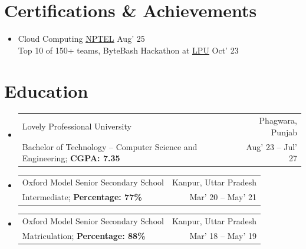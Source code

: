 \documentclass[a4paper,10pt]{article}
\makeatletter
\newcommand{\resumeSubheading}[4]{
  \vspace{-1pt}\item
  \begin{tabular*}{\textwidth}[t]{l@{\extracolsep{\fill}}r}
    \fontsize{10}{12}\selectfont\textcolor{LPUBlue}{#1} & \normalsize #2 \\
    \normalsize#3 & \normalsize #4 \\
  \end{tabular*}\vspace{-6pt}
}
\newcommand{\resumeSubHeadingListStart}{\begin{itemize}[leftmargin=0in, label={}]}
\newcommand{\resumeSubHeadingListEnd}{\end{itemize}}
\makeatother
\begin{document}
\section{Certifications \& Achievements}
\resumeSubHeadingListStart
  \item
  \fontsize{10}{12}\selectfont Cloud Computing \normalsize\textbar{} \href{https://drive.google.com/file/d/18q9WO3GKa6SigJ47DDjZxXxnqXNQLHUt/view?usp=drive_link}{\underline{NPTEL}} \hfill Aug' 25 \\[2pt]
  \fontsize{10}{12}\selectfont Top 10 of 150+ teams, ByteBash Hackathon at \href{https://drive.google.com/file/d/1JfaVKZB82MZYrMUgE8fyJZ9BMRTY-xoW/view?usp=drive_link}{\underline{LPU}} \hfill Oct' 23
\resumeSubHeadingListEnd

\section{Education}
\resumeSubHeadingListStart
  \resumeSubheading
    {Lovely Professional University}{Phagwara, Punjab}
    {Bachelor of Technology -- Computer Science and Engineering; \textbf{CGPA: 7.35}}{Aug' 23 -- Jul' 27}
  \resumeSubheading
    {Oxford Model Senior Secondary School}{Kanpur, Uttar Pradesh}
    {Intermediate; \textbf{Percentage: 77\%}}{Mar' 20 -- May' 21}
  \resumeSubheading
    {Oxford Model Senior Secondary School}{Kanpur, Uttar Pradesh}
    {Matriculation; \textbf{Percentage: 88\%}}{Mar' 18 -- May' 19}
\resumeSubHeadingListEnd
\end{document}
